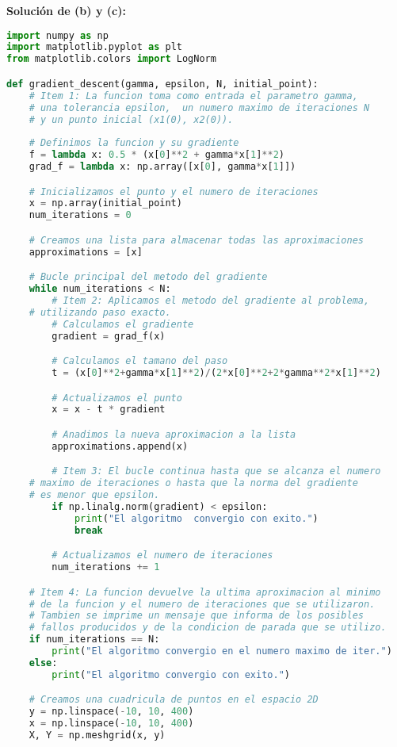 \begin{enumerate}
\begin{enumerate}[\bfseries (a)]
	    \textbf{Solución de (b) y (c):}
\begin{lstlisting}[language=Python]
import numpy as np
import matplotlib.pyplot as plt
from matplotlib.colors import LogNorm

def gradient_descent(gamma, epsilon, N, initial_point):
    # Item 1: La funcion toma como entrada el parametro gamma,
    # una tolerancia epsilon,  un numero maximo de iteraciones N 
    # y un punto inicial (x1(0), x2(0)).
    
    # Definimos la funcion y su gradiente
    f = lambda x: 0.5 * (x[0]**2 + gamma*x[1]**2)
    grad_f = lambda x: np.array([x[0], gamma*x[1]])

    # Inicializamos el punto y el numero de iteraciones
    x = np.array(initial_point)
    num_iterations = 0

    # Creamos una lista para almacenar todas las aproximaciones
    approximations = [x]

    # Bucle principal del metodo del gradiente
    while num_iterations < N:
        # Item 2: Aplicamos el metodo del gradiente al problema, 
	# utilizando paso exacto.
        # Calculamos el gradiente
        gradient = grad_f(x)

        # Calculamos el tamano del paso
        t = (x[0]**2+gamma*x[1]**2)/(2*x[0]**2+2*gamma**2*x[1]**2)

        # Actualizamos el punto
        x = x - t * gradient

        # Anadimos la nueva aproximacion a la lista
        approximations.append(x)

        # Item 3: El bucle continua hasta que se alcanza el numero
	# maximo de iteraciones o hasta que la norma del gradiente 
	# es menor que epsilon.
        if np.linalg.norm(gradient) < epsilon:
            print("El algoritmo  convergio con exito.")
            break

        # Actualizamos el numero de iteraciones
        num_iterations += 1

    # Item 4: La funcion devuelve la ultima aproximacion al minimo 
    # de la funcion y el numero de iteraciones que se utilizaron. 
    # Tambien se imprime un mensaje que informa de los posibles
    # fallos producidos y de la condicion de parada que se utilizo.
    if num_iterations == N:
        print("El algoritmo convergio en el numero maximo de iter.")
    else:
        print("El algoritmo convergio con exito.")

    # Creamos una cuadricula de puntos en el espacio 2D
    y = np.linspace(-10, 10, 400)
    x = np.linspace(-10, 10, 400)
    X, Y = np.meshgrid(x, y)


\end{lstlisting}
\end{enumerate}
\end{enumerate}
